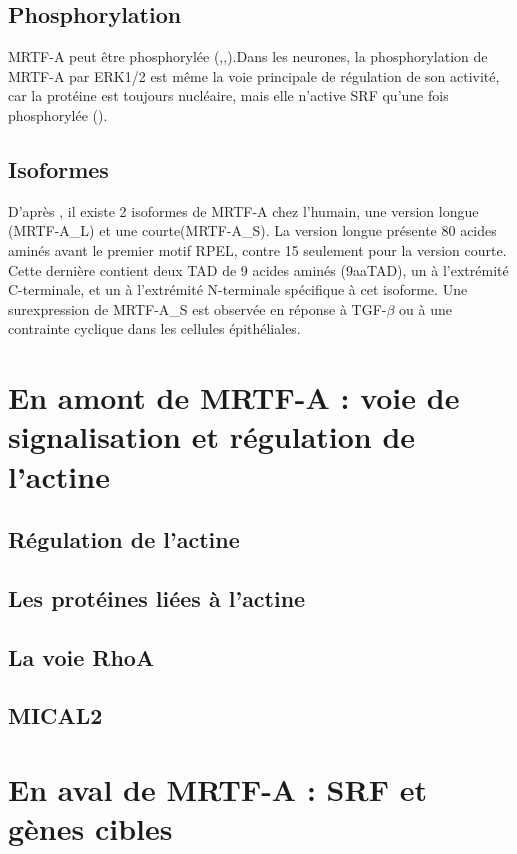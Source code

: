 \documentclass{article}
\begin{document}
 \subsection{Phosphorylation}
	MRTF-A peut être phosphorylée (\cite{miralles_actin_2003},\cite{cen_myocardin/mkl_2004},).Dans les neurones, la phosphorylation de MRTF-A par ERK1/2 est même la voie principale de régulation de son activité, car la protéine est toujours nucléaire, mais elle n'active SRF qu'une fois phosphorylée (\cite{kalita_role_2006}).
	
 \subsection{Isoformes}
 D'après \cite{scharenberg_tgf-_2014}, il existe 2 isoformes de MRTF-A chez l'humain, une version longue (MRTF-A\_L) et une courte(MRTF-A\_S). La version longue présente 80 acides aminés avant le premier motif RPEL, contre 15 seulement pour la version courte. Cette dernière contient deux TAD de 9 acides aminés (9aaTAD), un à l'extrémité C-terminale, et un à l'extrémité N-terminale spécifique à cet isoforme. Une surexpression de MRTF-A\_S est observée en réponse à TGF-$\beta$ ou à une contrainte cyclique dans les cellules épithéliales. 
 
 

\section{En amont de MRTF-A : voie de signalisation et régulation de l'actine} 
\subsection{Régulation de l'actine}
\subsection{Les protéines liées à l'actine}
\subsection{La voie RhoA}
\subsection{MICAL2}

\section{En aval de MRTF-A : SRF et gènes cibles}
\end{document}
